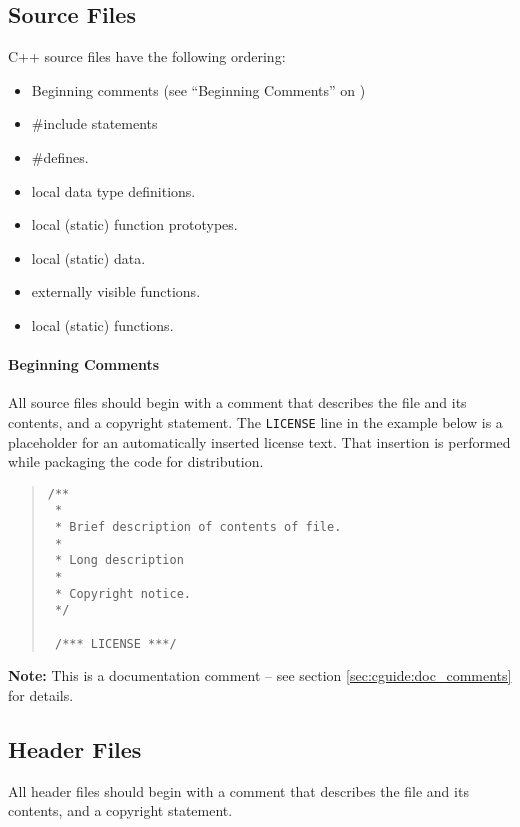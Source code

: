 \documentclass{article}
\newcommand{\T}{\texttt}
\begin{document}
\subsection{Source Files}

C++ source files have the following ordering: 

\begin{itemize}
  \item Beginning comments (see ``Beginning Comments'' on
        \pageref{sec:cguide:beginning_comments}) 
  \item \#include statements
  \item \#defines.
  \item local data type definitions.
  \item local (static) function prototypes.
  \item local (static) data.
  \item externally visible functions.
  \item local (static) functions.
\end{itemize}

\paragraph{Beginning Comments}
\label{sec:cguide:beginning_comments}

All source files should begin with a comment that describes the file
and its contents, and a copyright statement.  The \T{LICENSE} line in the
example below is a placeholder for an automatically inserted license
text.  That insertion is performed while packaging the code for
distribution.

\begin{quote}
\begin{verbatim}
/** 
 *
 * Brief description of contents of file.
 * 
 * Long description
 * 
 * Copyright notice.
 */

 /*** LICENSE ***/

\end{verbatim}
\end{quote}

\textbf{Note:}
This is a documentation comment -- see section
\ref{sec:cguide:doc_comments} for details.

\subsection{Header Files}

All header files should begin with a comment that describes the file
and its contents, and a copyright statement.
\end{document}
